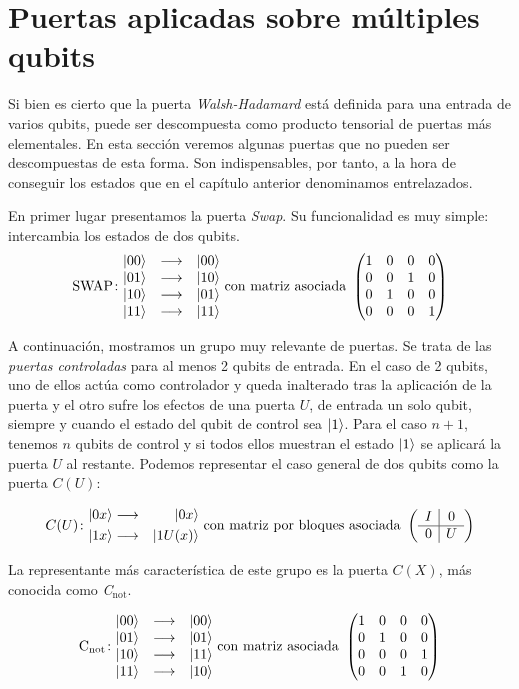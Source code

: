 \section{Puertas aplicadas sobre múltiples qubits}

Si bien es cierto que la puerta \textit{Walsh-Hadamard} está definida para una entrada de varios qubits, puede ser descompuesta como producto tensorial de puertas más elementales. En esta sección veremos algunas puertas que no pueden ser descompuestas de esta forma. Son indispensables, por tanto, a la hora de conseguir los estados que en el capítulo anterior denominamos entrelazados.

En primer lugar presentamos la puerta \textit{Swap}. Su funcionalidad es muy simple:  intercambia los estados de dos qubits.
\[\gatefour{\mathrm{SWAP}}{\ket{00}}{\ket{10}}{\ket{01}}{\ket{11}}\mathrm{\ con\ matriz\ asociada\ }\left(\begin{matrix}1&0&0&0\\0&0&1&0\\0&1&0&0\\0&0&0&1\end{matrix}\right)\]

A continuación, mostramos un grupo muy relevante de puertas. Se trata de las \textit{puertas controladas} para al menos 2 qubits de entrada. En el caso de 2 qubits, uno de ellos actúa como controlador y queda inalterado tras la aplicación de la puerta y el otro sufre los efectos de una puerta $U$, de entrada un solo qubit, siempre y cuando el estado del qubit de control sea $\left|1\right\rangle$. Para el caso $n+1$, tenemos $n$ qubits de control y si todos ellos muestran el estado $\left|1\right\rangle$ se aplicará la puerta $U$ al restante. Podemos representar el caso general de dos qubits como la puerta $C(U)$:

\[C(U)\colon \begin{aligned}\ket{0x}&\longrightarrow&\ket{0x}\\\ket{1x}&\longrightarrow&\ket{1U(x)}\end{aligned} \mathrm{\ con\ matriz\ por\ bloques\ asociada\ }\left(\begin{array}{c|c}I&0\\\hline0&U\end{array}\right)\]

La representante más característica de este grupo es la puerta $C(X)$, más conocida como \textit{C$_\textrm{not}$}.

\[\gatefour{\mathrm{C_{not}}}{\ket{00}}{\ket{01}}{\ket{11}}{\ket{10}}\mathrm{\ con\ matriz\ asociada\ }\left(\begin{matrix}1&0&0&0\\0&1&0&0\\0&0&0&1\\0&0&1&0\end{matrix}\right)\]

